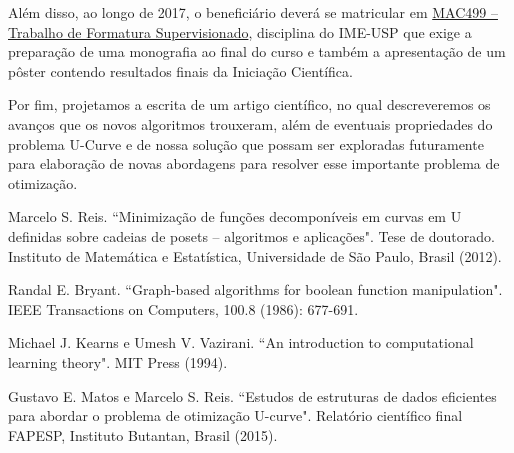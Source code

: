 \documentclass[12pt]{article}
\begin{document}
Além disso, ao longo de 2017, o beneficiário deverá se matricular em \href{https://uspdigital.usp.br/jupiterweb/obterDisciplina?sgldis=MAC0499\&nomdis=}{MAC499 -- Trabalho de Formatura Supervisionado}, disciplina do IME-USP que exige a preparação de uma monografia ao final do curso e também a apresentação de um pôster contendo resultados finais da Iniciação Científica.

Por fim, projetamos a escrita de um artigo científico, no qual descreveremos os avanços que os novos algoritmos trouxeram, além de eventuais propriedades do problema U-Curve e de nossa solução que 
possam ser exploradas futuramente para elaboração de novas abordagens para resolver esse importante problema de otimização.

\begin{thebibliography}{}
    Marcelo S. Reis. ``Minimização de funções decomponíveis em curvas em U definidas sobre cadeias de posets -- algoritmos e aplicações".
    Tese de doutorado. Instituto de Matemática e Estatística, Universidade de São Paulo, Brasil (2012).

Randal E. Bryant. ``Graph-based algorithms for boolean function manipulation". IEEE Transactions on Computers, 100.8 (1986): 677-691. 

Michael J. Kearns e Umesh V. Vazirani. ``An introduction to computational learning theory". MIT Press (1994).

Gustavo E. Matos e Marcelo S. Reis. ``Estudos de estruturas de dados eficientes para abordar o problema de otimização U-curve". Relatório científico final FAPESP, Instituto Butantan, Brasil (2015).




\end{thebibliography}
\end{document}

